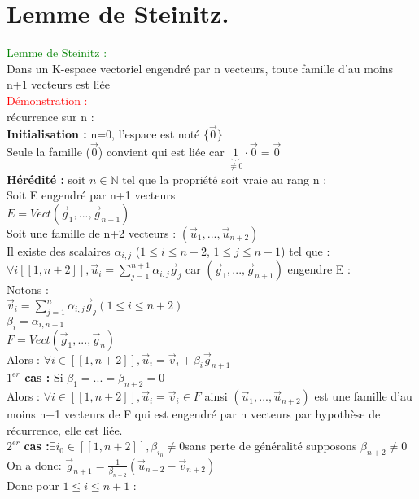 \documentclass{article}
\begin{document}
\section{Lemme de Steinitz.}
\textcolor{green}{Lemme de Steinitz :} \\
Dans un K-espace vectoriel engendré par n vecteurs, toute famille d'au moins n+1 vecteurs est liée \\
\textcolor{red}{Démonstration :} \\
récurrence sur n : \\
{\bf Initialisation :}  n=0, l'espace est noté $ \lbrace  \vec 0 \rbrace $ \\
Seule la famille ($\vec 0$) convient qui est liée car $\underbrace{1}_{\neq 0}\cdot \vec 0= \vec 0$ \\
{\bf Hérédité : } soit $n \in \mathbb N$ tel que la propriété soit vraie au rang n : \\
Soit E engendré par n+1 vecteurs \\
$E=Vect(\vec g_1,...,\vec g_{n+1})$ \\
Soit une famille de n+2 vecteurs : $(\vec u_1,...,\vec u_{n+2})$ \\
Il existe des scalaires $\alpha_{i,j}$ ($1 \leq i \leq n+2$, $1 \leq j \leq n+1$) tel que : \\
$\forall i [[1,n+2]], \vec u_i= \sum_{j=1}^{n+1} \alpha_{i,j} \vec g_j$ car $(\vec g_1,...,\vec g_{n+1})$ engendre E : \\
Notons : \\
$\vec v_i=\sum_{j=1}^n \alpha_{i,j} \vec g_j (1 \leq i \leq n+2)$ \\
$\beta_i=\alpha_{i,n+1}$ \\
$F=Vect(\vec g_1,...,\vec g_n)$ \\
Alors : $\forall i \in [[1,n+2]], \vec u_i=\vec v_i + \beta_i \vec g_{n+1}$ \\
{\boldmath \bf $1^{er}$ cas :} Si $\beta_1=...=\beta_{n+2}=0$ \\
Alors : $\forall i \in [[1,n+2]], \vec u_i=\vec v_i \in F$ ainsi $(\vec u_1,..., \vec u_{n+2})$ est une famille d'au moins n+1 vecteurs de F qui est engendré par n vecteurs par hypothèse de récurrence, elle est liée. \\
{\boldmath $2^{er}$ \bf cas :}$\exists i_0 \in [[1,n+2]], \beta_{i_0}\neq 0$sans perte de généralité supposons $\beta_{n+2}\neq 0$ \\
On a donc: $\vec g_{n+1}= \frac{1}{\beta_{n+2}}(\vec u_{n+2}-\vec v_{n+2})$ \\
Donc pour $1 \leq i \leq n+1$ : \\
\end{document}
